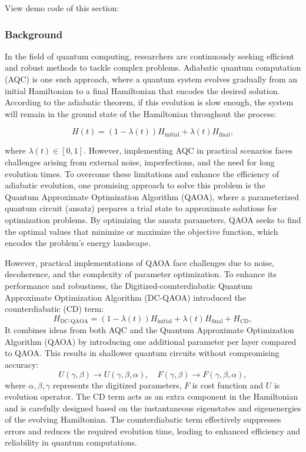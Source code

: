 

View demo code of this section: 

\subsubsection{Background}
In the field of quantum computing, researchers are continuously seeking efficient and robust methods to tackle complex problems. Adiabatic quantum computation (AQC) is one such approach, where a quantum system evolves gradually from an initial Hamiltonian to a final Hamiltonian that encodes the desired solution. According to the adiabatic theorem, if this evolution is slow enough, the system will remain in the ground state of the Hamiltonian throughout the process:

\begin{equation}
    H(t) = (1-\lambda(t))H_{\text{initial}} + \lambda(t)H_{\text{final}},
\end{equation}

where $\lambda(t)\in[0,1]$. However, implementing AQC in practical scenarios faces challenges arising from external noise, imperfections, and the need for long evolution times. To overcome these limitations and enhance the efficiency of adiabatic evolution, one promising approach to solve this problem is the Quantum Approximate Optimization Algorithm (QAOA), where a parameterized quantum circuit (ansatz) prepares a trial state to approximate solutions for optimization problems. By optimizing the ansatz parameters, QAOA seeks to find the optimal values that minimize or maximize the objective function, which encodes the problem's energy landscape.

However, practical implementations of QAOA face challenges due to noise, decoherence, and the complexity of parameter optimization. To enhance its performance and robustness, the Digitized-counterdiabatic Quantum Approximate Optimization Algorithm (DC-QAOA) introduced the counterdiabatic (CD) term:
\begin{equation}
    H_{\text{DC-QAOA}} = (1 - \lambda(t))H_{\text{initial}} + \lambda(t)H_{\text{final}} + H_{\text{CD}},
\end{equation}
It combines ideas from both AQC and the Quantum Approximate Optimization Algorithm (QAOA) by introducing one additional parameter per layer compared to QAOA. This results in shallower quantum circuits without compromising accuracy:
\begin{equation}
    U(\gamma, \beta)\to U(\gamma, \beta, \alpha), \quad F(\gamma, \beta)\to F(\gamma, \beta, \alpha),
\end{equation}
where $\alpha, \beta, \gamma$ represents the digitized parameters, $F$ is cost function and $U$ is evolution operator.
The CD term acts as an extra component in the Hamiltonian and is carefully designed based on the instantaneous eigenstates and eigenenergies of the evolving Hamiltonian.  The counterdiabatic term effectively suppresses errors and reduces the required evolution time, leading to enhanced efficiency and reliability in quantum computations.

